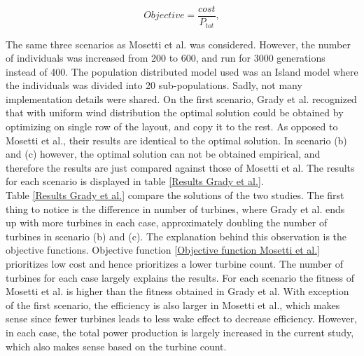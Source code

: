 \begin{equation}
Objective = \frac{cost}{P_{tot}},
\label{Objective function Grady et al.}
\end{equation}


\noindent The same three scenarios as Mosetti et al. was considered. However, the number of individuals was increased from 200 to 600, and run for 3000 generations instead of 400. The population distributed model used was an Island model where the individuals was divided into 20 sub-populations. Sadly, not many implementation details were shared. On the first scenario, Grady et al. recognized that with uniform wind distribution the optimal solution could be obtained by optimizing on single row of the layout, and copy it to the rest. As opposed to Mosetti et al., their results are identical to the optimal solution. In scenario (b) and (c) however, the optimal solution can not be obtained empirical, and therefore the results are just compared against those of Mosetti et al. The results for each scenario is displayed in table \ref{Results Grady et al.}. \\

\noindent Table \ref{Results Grady et al.} compare the solutions of the two studies. The first thing to notice is the difference in number of turbines, where Grady et al. ends up with more turbines in each case, approximately doubling the number of turbines in scenario (b) and (c). The explanation behind this observation is the objective functions. Objective function \ref{Objective function Mosetti et al.} prioritizes low cost and hence prioritizes a lower turbine count. The number of turbines for each case largely explains the results. For each scenario the fitness of Mosetti et al. is higher than the fitness obtained in Grady et al. With exception of the first scenario, the efficiency is also larger in Mosetti et al., which makes sense since fewer turbines leads to less wake effect to decrease efficiency. However, in each case, the total power production is largely increased in the current study, which also makes sense based on the turbine count. \\


